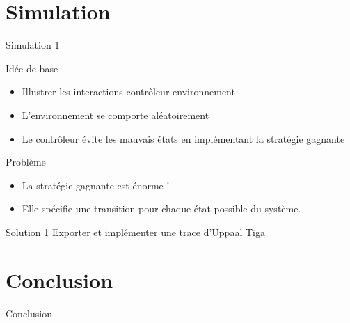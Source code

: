 \documentclass{beamer} %
\begin{document}
\section{Simulation}
\begin{frame}{Simulation 1}

\begin{block}{Idée de base}
\begin{itemize}
\item Illustrer les interactions contrôleur-environnement
\item L'environnement se comporte aléatoirement 
\item Le contrôleur évite les mauvais états en implémentant la stratégie gagnante 
\end{itemize}
\end{block}

\begin{block}{Problème}

\begin{itemize}
\item La stratégie gagnante est énorme ! 
\item Elle spécifie une transition pour chaque état possible du système. 
\end{itemize}

\end{block}

\begin{block}{Solution 1}
Exporter et implémenter une trace d'Uppaal Tiga


\end{block}

\end{frame}


\section{Conclusion}
\begin{frame}{Conclusion}

\end{frame}
\end{document}
